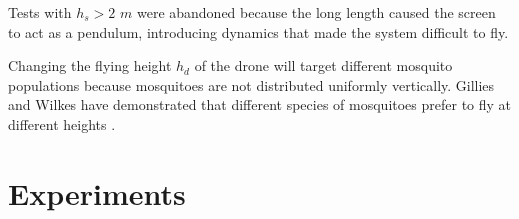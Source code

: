 \documentclass[letterpaper, 10 pt, conference]{ieeeconf}  %
\newcommand{\todo}[1]{\vspace{5 mm}\par \noindent \framebox{\begin{minipage}[c]{0.98 \columnwidth} \ttfamily\flushleft \textcolor{red}{#1}\end{minipage}}\vspace{5 mm}\par}
\begin{document}
 Tests with $h_s > 2$ $m$ were abandoned because the long length caused the screen to act as a pendulum, introducing dynamics that made the system difficult to fly.
 
Changing the flying height $h_d$ of the drone will target different mosquito populations because mosquitoes are not distributed uniformly vertically. 
 Gillies and Wilkes have demonstrated that different species of mosquitoes prefer to fly at different heights \cite{gillies1976vertical}. 





%
%    
    
    \section{Experiments}\label{sec:Experiments}
    
    \todo{replace with the new experiment description}
    
    


\end{document}
